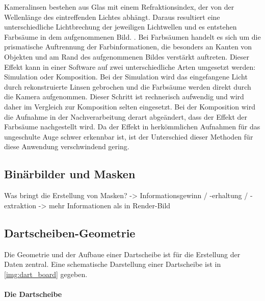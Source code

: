 Kameralinsen bestehen aus Glas mit einem Refraktionsindex, der von der Wellenlänge des eintreffenden Lichtes abhängt. Daraus resultiert eine unterschiedliche Lichtbrechung der jeweiligen Lichtwellen und es entstehen Farbsäume in dem aufgenommenen Bild. \cite{lens_distortion, camera_everything}. Bei Farbsäumen handelt es sich um die prismatische Auftrennung der Farbinformationen, die besonders an Kanten von Objekten und am Rand des aufgenommenen Bildes verstärkt auftreten. Dieser Effekt kann in einer Software auf zwei unterschiedliche Arten umgesetzt werden: Simulation oder Komposition. Bei der Simulation wird das eingefangene Licht durch rekonstruierte Linsen gebrochen und die Farbsäume werden direkt durch die Kamera aufgenommen. Dieser Schritt ist rechnerisch aufwendig und wird daher im Vergleich zur Komposition selten eingesetzt. Bei der Komposition wird die Aufnahme in der Nachverarbeitung derart abgeändert, dass der Effekt der Farbsäume nachgestellt wird. Da der Effekt in herkömmlichen Aufnahmen für das ungeschulte Auge schwer erkennbar ist, ist der Unterschied dieser Methoden für diese Anwendung verschwindend gering.


\subsection{Binärbilder und Masken}
\label{sec:masken}

Was bringt die Erstellung von Masken? -> Informationsgewinn / -erhaltung / -extraktion -> mehr Informationen als in Render-Bild



\subsection{Dartscheiben-Geometrie}  %
\label{sec:dartscheiben_geometrie}

Die Geometrie und der Aufbaue einer Dartscheibe ist für die Erstellung der Daten zentral. Eine schematische Darstellung einer Dartscheibe ist in \autoref{img:dart_board} gegeben.

\paragraph{Die Dartscheibe}

